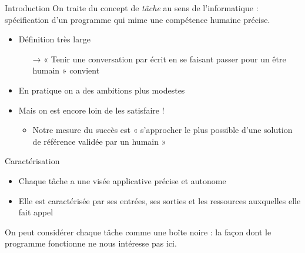 \documentclass[xcolor={svgnames}, french]{beamer}
\begin{document}
\begin{frame}{Introduction}
	On traite du concept de \textit{tâche} au sens de l'informatique : spécification d'un programme qui mime une compétence humaine précise.

	\begin{itemize}
		\item Définition très large
			\begin{itemize}
				\item[→] « Tenir une conversation par écrit en se faisant passer pour un être humain » convient
			\end{itemize}
		\item En pratique on a \alert{des ambitions plus modestes}
		\item Mais on est encore loin de les satisfaire !
		 \begin{itemize}
			 \item Notre mesure du succès est « s'approcher le plus possible d'une solution de référence validée par un humain »
		 \end{itemize}
	\end{itemize}
 \end{frame}

\begin{frame}{Caractérisation}
	\begin{itemize}
		\item Chaque tâche a une visée applicative précise et autonome
		\item Elle est caractérisée par ses \alert{entrées}, ses \alert{sorties} et les \alert{ressources} auxquelles elle fait appel
	\end{itemize}

	\begin{figure}
		\tikzset{external/export=true}
	\end{figure}

	On peut considérer chaque tâche comme une \alert{boîte noire} : la façon dont le programme fonctionne ne nous intéresse pas ici.
\end{frame}
\end{document}
